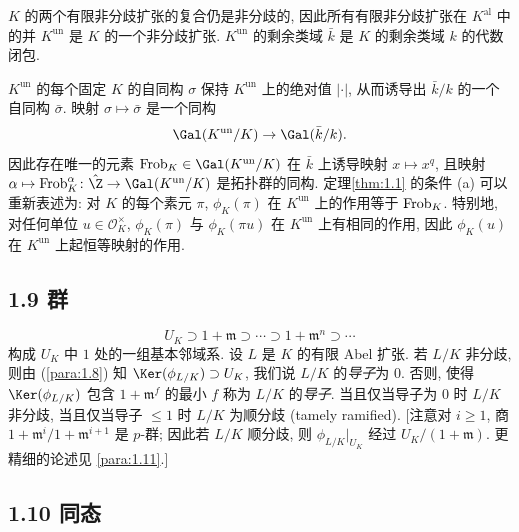 \begin{npara}\label{para:1.8}
$K$ 的两个有限非分歧扩张的复合仍是非分歧的, 因此所有有限非分歧扩张在 $K^{\mathrm{al}}$ 中的并 $K^{\mathrm{un}}$ 是 $K$ 的一个非分歧扩张. $K^{\mathrm{un}}$ 的剩余类域 $\bar{k}$ 是 $K$ 的剩余类域 $k$ 的代数闭包.

$K^{\mathrm{un}}$ 的每个固定 $K$ 的自同构 $\sigma$ 保持 $K^{\mathrm{un}}$ 上的绝对值 $|\cdot|$, 从而诱导出 $\bar{k}/k$ 的一个自同构 $\bar{\sigma}$. 映射 $\sigma\mapsto\bar{\sigma}$ 是一个同构
\[
\Gal(K^{\mathrm{un}}/K)\to\Gal(\bar{k}/k).
\]
因此存在唯一的元素 $\Frob_K\in\Gal(K^{\mathrm{un}}/K)$ 在 $\bar{k}$ 上诱导映射 $x\mapsto x^q$, 且映射 $\alpha\mapsto\Frob_K^{\alpha}\colon\hat{\Z}\to\Gal(K^{\mathrm{un}}/K)$ 是拓扑群的同构. 定理\ref{thm:1.1} 的条件 (a) 可以重新表述为: 对 $K$ 的每个素元 $\pi$, $\phi_K(\pi)$ 在 $K^{\mathrm{un}}$ 上的作用等于 $\operatorname{Frob}_K$. 特别地, 对任何单位 $u\in\mathcal{O}_K^{\times}$, $\phi_K(\pi)$ 与 $\phi_K(\pi u)$ 在 $K^{\mathrm{un}}$ 上有相同的作用, 因此 $\phi_K(u)$ 在 $K^{\mathrm{un}}$ 上起恒等映射的作用.
\end{npara}

\subsection*{1.9 群}

\begin{equation*}
U_K\supset 1+\mathfrak{m}\supset\cdots\supset 1+\mathfrak{m}^n\supset\cdots
\tag{7}\label{eqn:i.1.9.filt}
\end{equation*}
构成 $U_K$ 中 $1$ 处的一组基本邻域系. 设 $L$ 是 $K$ 的有限 Abel 扩张. 若 $L/K$ 非分歧, 则由 (\ref{para:1.8}) 知 $\Ker(\phi_{L/K})\supset U_K$, 我们说 $L/K$ 的\emph{导子}为 $0$. 否则, 使得 $\Ker(\phi_{L/K})$ 包含 $1+\mathfrak{m}^f$ 的最小 $f$ 称为 $L/K$ 的\emph{导子}. 当且仅当导子为 $0$ 时 $L/K$ 非分歧, 当且仅当导子 $\le 1$ 时 $L/K$ 为顺分歧 (tamely ramified). [注意对 $i\ge 1$, 商 $1+\mathfrak{m}^i/1+\mathfrak{m}^{i+1}$ 是 $p$-群; 因此若 $L/K$ 顺分歧, 则 $\phi_{L/K}|_{U_K}$ 经过 $U_K/(1+\mathfrak{m})$. 更精细的论述见 \ref{para:1.11}.]

\subsection*{1.10 同态}


